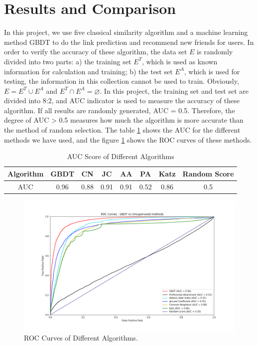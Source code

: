 \documentclass{article}
\begin{document}
\section{Results and Comparison}
In this project, we use five classical similarity algorithm and a machine learning method GBDT to do the link prediction and recommend new friends for users. In order to verify the accuracy of these algorithm, the data set $E$ is randomly divided into two parts: a) the training set $E^T$, which is used as known information for calculation and training; b) the test set $E^A$, which is used for testing, the information in this collection cannot be used to train. Obviously, $E = E^T \cup E^A$ and $E^T \cap E^A = \varnothing$. In this project, the training set and test set are divided into 8:2, and AUC indicator is used to measure the accuracy of these algorithm. If all results are randomly generated, AUC = 0.5. Therefore, the degree of AUC > 0.5 measures how much the algorithm is more accurate than the method of random selection. The table \ref{result_t} shows the AUC for the different methods we have used, and the figure \ref{result_t} shows the ROC curves of these methods.
\begin{table}[h]
	\centering
	\caption{AUC Score of Different Algorithms}
	\label{result_t}
	\begin{tabular}{cccccccc}

		\hline

		Algorithm & GBDT & CN & JC &  AA & PA & Katz & Random Score \\

		\hline

		AUC& 0.96 & 0.88 & 0.91  & 0.91 & 0.52 & 0.86 & 0.5 \\

		\hline

	\end{tabular}

	
\end{table}

\begin{figure}[h!]
	\includegraphics[width=13cm]{images/result.png}
	\centering
	\caption{ROC Curves of Different Algorithms.}	\label{result_fg}
\end{figure}
\end{document}
